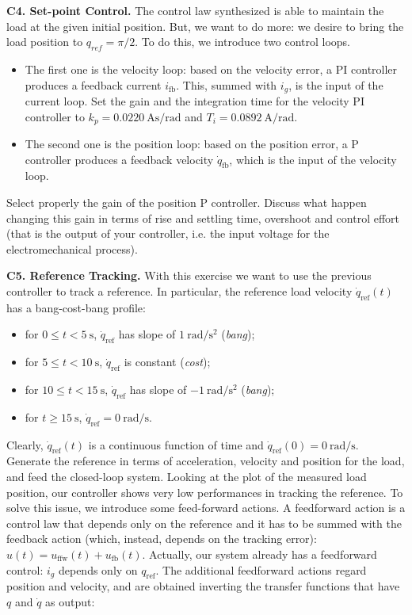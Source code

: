 \documentclass[11pt]{article}
\begin{document}
\par
\textbf{C4. Set-point Control.} The control law synthesized is able to maintain the load at the given initial position. But, we want to do more: we desire to bring the load position to $q_{ref} = \pi/2$. To do this, we introduce two control loops.
\begin{itemize}
    \item The first one is the velocity loop: based on the velocity error, a PI controller produces a feedback current $i_{\mathrm{fb}}$. This, summed with $i_g$, is the input of the current loop. Set the gain and the integration time for the velocity PI controller to $k_p = 0.0220 \ \mathrm{As/rad}$ and $T_i = 0.0892\ \mathrm{A/rad}$.
    \item The second one is the position loop: based on the position error, a P controller produces a feedback velocity $\dot{q}_{\mathrm{fb}}$, which is the input of the velocity loop.
\end{itemize}
Select properly the gain of the position P controller. Discuss what happen changing this gain in terms of rise and settling time, overshoot and control effort (that is the output of your controller, i.e. the input voltage for the electromechanical process).
\par
\textbf{C5. Reference Tracking.} With this exercise we want to use the previous controller to track a reference. In particular, the reference load velocity $\dot{q}_\mathrm{ref}(t)$ has a bang-cost-bang profile:
\begin{itemize}
    \item for $0\leq t < 5 \ \mathrm{s}$, $\dot{q}_\mathrm{ref}$ has slope of $1 \ \mathrm{rad/s^2}$ (\textit{bang});
    \item for $5\leq t < 10 \ \mathrm{s}$, $\dot{q}_\mathrm{ref}$ is constant (\textit{cost});
    \item for $10\leq t < 15 \ \mathrm{s}$, $\dot{q}_\mathrm{ref}$ has slope of $-1 \ \mathrm{rad/s^2}$ (\textit{bang});
    \item for $t \geq 15 \ \mathrm{s}$, $\dot{q}_\mathrm{ref}=0 \ \mathrm{rad/s}$.
\end{itemize}
Clearly, $\dot{q}_\mathrm{ref}(t)$ is a continuous function of time and $\dot{q}_\mathrm{ref}(0) = 0 \ \mathrm{rad/s}$. Generate the reference in terms of acceleration, velocity and position for the load, and feed the closed-loop system. Looking at the plot of the measured load position, our controller shows very low performances in tracking the reference. To solve this issue, we introduce some feed-forward actions. A feedforward action is a control law that depends only on the reference and it has to be summed with the feedback action (which, instead, depends on the tracking error): $u(t) = u_{\mathrm{ffw}}(t) + u_{\mathrm{fb}}(t)$. Actually, our system already has a feedforward control: $i_g$ depends only on $q_{\mathrm{ref}}$. The additional feedforward actions regard position and velocity, and are obtained inverting the transfer functions that have $q$ and $\dot{q}$ as output:
\end{document}

